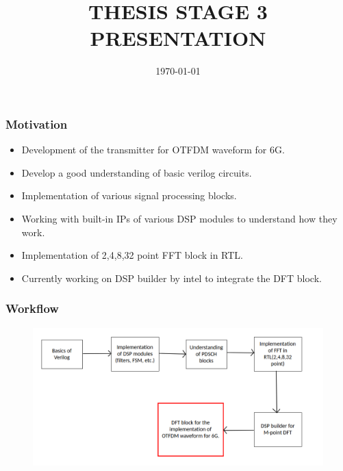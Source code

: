 \documentclass{beamer}
\title{THESIS STAGE 3 PRESENTATION}
\institute{Indian Institute of Technology, Hyderabad.}
\date{\today}
\begin{document}
\begin{frame}
\titlepage
\end{frame}

\begin{frame}
	\frametitle{Motivation}
	\begin{itemize}
		\item Development of the transmitter for OTFDM waveform for 6G.
		\item Develop a good understanding of basic verilog circuits.
		\item Implementation of various signal processing blocks.
		\item Working with built-in IPs of various DSP modules to understand how they work.
		\item Implementation of 2,4,8,32 point FFT block in RTL.
		\item Currently working on DSP builder by intel to integrate the DFT block.
	\end{itemize}   
\end{frame}

\begin{frame}
	\frametitle{Workflow}
		\begin{figure}[h!]
  		\centering
    			\includegraphics[width=\linewidth]{./figs/workflow.png}
		\end{figure}	
\end{frame}
\end{document}
